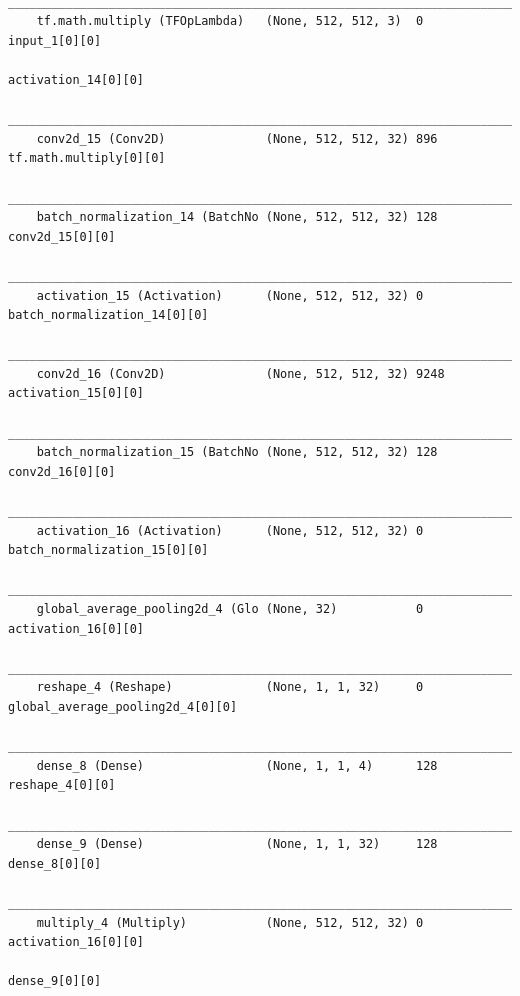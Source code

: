 {\begin{verbatim}
    __________________________________________________________________________________________________
    tf.math.multiply (TFOpLambda)   (None, 512, 512, 3)  0           input_1[0][0]                    
                                                                        activation_14[0][0]              
    __________________________________________________________________________________________________
    conv2d_15 (Conv2D)              (None, 512, 512, 32) 896         tf.math.multiply[0][0]           
    __________________________________________________________________________________________________
    batch_normalization_14 (BatchNo (None, 512, 512, 32) 128         conv2d_15[0][0]                  
    __________________________________________________________________________________________________
    activation_15 (Activation)      (None, 512, 512, 32) 0           batch_normalization_14[0][0]     
    __________________________________________________________________________________________________
    conv2d_16 (Conv2D)              (None, 512, 512, 32) 9248        activation_15[0][0]              
    __________________________________________________________________________________________________
    batch_normalization_15 (BatchNo (None, 512, 512, 32) 128         conv2d_16[0][0]                  
    __________________________________________________________________________________________________
    activation_16 (Activation)      (None, 512, 512, 32) 0           batch_normalization_15[0][0]     
    __________________________________________________________________________________________________
    global_average_pooling2d_4 (Glo (None, 32)           0           activation_16[0][0]              
    __________________________________________________________________________________________________
    reshape_4 (Reshape)             (None, 1, 1, 32)     0           global_average_pooling2d_4[0][0] 
    __________________________________________________________________________________________________
    dense_8 (Dense)                 (None, 1, 1, 4)      128         reshape_4[0][0]                  
    __________________________________________________________________________________________________
    dense_9 (Dense)                 (None, 1, 1, 32)     128         dense_8[0][0]                    
    __________________________________________________________________________________________________
    multiply_4 (Multiply)           (None, 512, 512, 32) 0           activation_16[0][0]              
                                                                        dense_9[0][0]                    

\end{verbatim}}
